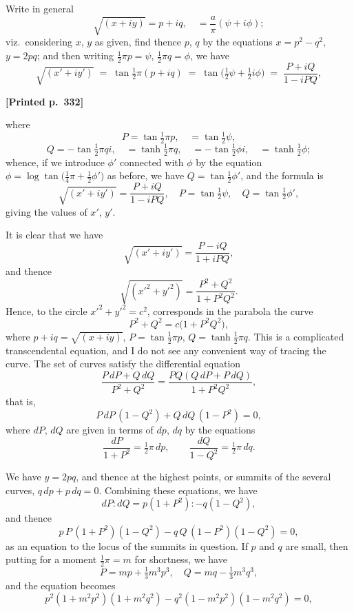 \documentclass[11pt]{article}
\begin{document}
\medskip

Write in general
\[
\sqrt{(x+iy)} = p+iq,\quad =\frac{a}{\pi}(\psi+i\phi);
\]
viz.\ considering $x$, $y$ as given, find thence $p$, $q$ by the equations $x=p^{2}-q^{2}$, $y=2pq$; and then writing $\tfrac{1}{2}\pi p = \psi$, $\tfrac{1}{2}\pi q = \phi$, we have
\[
\sqrt{(x'+iy')} \;=\; \tan\tfrac{1}{2}\pi(p+iq) \;=\; \tan\bigl(\tfrac{1}{2}\psi+\tfrac{1}{2}i\phi\bigr) \;=\; \frac{P+iQ}{1-iPQ},
\]

\medskip

\noindent\textbf{[Printed p.~332]}\hfill

\noindent where
\[
P = \tan\tfrac{1}{2}\pi p,\quad =\tan\tfrac{1}{2}\psi,
\]
\[
Q = -\tan\tfrac{1}{2}\pi qi,\quad =\tanh\tfrac{1}{2}\pi q,\quad =-\tan\tfrac{1}{2}\phi i,\quad =\tanh\tfrac{1}{2}\phi;
\]
whence, if we introduce $\phi'$ connected with $\phi$ by the equation $\phi=\log\tan\bigl(\tfrac{1}{4}\pi+\tfrac{1}{2}\phi'\bigr)$ as before, we have $Q=\tan\tfrac{1}{2}\phi'$, and the formula is
\[
\sqrt{(x'+iy')} = \frac{P+iQ}{1-iPQ},\quad P=\tan\tfrac{1}{2}\psi,\quad Q=\tan\tfrac{1}{2}\phi',
\]
giving the values of $x'$, $y'$.

It is clear that we have
\[
\sqrt{(x'+iy')} = \frac{P-iQ}{1+iPQ},
\]
and thence
\[
\sqrt{(x'^{2}+y'^{2})} = \frac{P^{2}+Q^{2}}{1+P^{2}Q^{2}}.
\]
Hence, to the circle $x'^{2}+y'^{2}=c^{2}$, corresponds in the parabola the curve
\[
P^{2}+Q^{2} = c\bigl(1+P^{2}Q^{2}\bigr),
\]
where $p+iq=\sqrt{(x+iy)}$, $P=\tan\tfrac{1}{2}\pi p$, $Q=\tanh\tfrac{1}{2}\pi q$. This is a complicated transcendental equation, and I do not see any convenient way of tracing the curve. The set of curves satisfy the differential equation
\[
\frac{P\,dP + Q\,dQ}{P^{2}+Q^{2}} = \frac{PQ(Q\,dP+P\,dQ)}{1+P^{2}Q^{2}},
\]
that is,
\[
P\,dP\,(1-Q^{2}) + Q\,dQ\,(1-P^{2}) = 0,
\]
where $dP$, $dQ$ are given in terms of $dp$, $dq$ by the equations
\[
\frac{dP}{1+P^{2}} = \tfrac{1}{2}\pi\,dp,\qquad \frac{dQ}{1-Q^{2}} = \tfrac{1}{2}\pi\,dq.
\]

We have $y=2pq$, and thence at the highest points, or summits of the several curves, $q\,dp + p\,dq = 0$. Combining these equations, we have
\[
dP : dQ = p(1+P^{2}) : -q(1-Q^{2}),
\]
and thence
\[
p\,P\,(1+P^{2})(1-Q^{2}) - q\,Q\,(1-P^{2})(1-Q^{2}) = 0,
\]
as an equation to the locus of the summits in question. If $p$ and $q$ are small, then putting for a moment $\tfrac{1}{2}\pi = m$ for shortness, we have
\[
P = mp + \tfrac{1}{3}m^{3}p^{3},\quad Q = mq - \tfrac{1}{3}m^{3}q^{3},
\]
and the equation becomes
\[
p^{2}(1+m^{2}p^{2})(1+m^{2}q^{2}) - q^{2}(1-m^{2}p^{2})(1-m^{2}q^{2}) = 0,
\]
\end{document}
